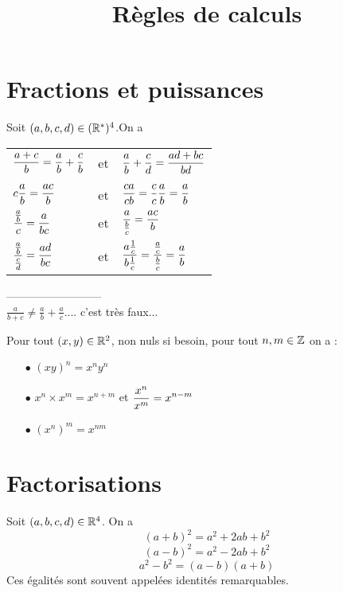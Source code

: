 \documentclass[a4paper, 11pt]{article}
\begin{document}
\title{Règles de calculs}

\section{Fractions et puissances}
\begin{prop}
	Soit $(a,b,c,d)\in (\mathbb{R}^*)^4$.On a
	\begin{center}
		\begin{tabular}{ l c l }
			$\displaystyle \frac{a+c}{b}=\frac{a}{b}+ \frac{c}{b}$          & et & $ \displaystyle \frac{a}{b}+\frac{c}{d}=\frac{ad+bc}{bd}$                                       \\  \\

			$\displaystyle c\frac{a}{b}=\frac{ac}{b} $                      & et & $\displaystyle \frac{ca}{cb}=\frac{c}{c}\frac{a}{b}  =\frac{a}{b}$ \vsec                        \\


			$\displaystyle \frac{\frac{a}{b}}{c} = \frac{a}{bc} $           & et & $\displaystyle \frac{a}{\frac{b}{c}} = \frac{ac}{b}$\vsec                                       \\

			$\displaystyle \frac{\frac{a}{b}}{\frac{c}{d}} = \frac{ad}{bc}$ & et & $\displaystyle \frac{a\frac{1}{c}}{b\frac{1}{c}} =\frac{\frac{a}{c}}{\frac{b}{c}} =\frac{a}{b}$
		\end{tabular}
	\end{center}
	--------------------------\\
	\footnotesize{ $\frac{a}{b+c }\neq \frac{a}{b}+\frac{a}{c}$.... c'est très faux...}
\end{prop}

\begin{prop} \label{prop-regle de calcul puissance}
	Pour tout $(x,y) \in \mathbb{R}^2$, non nuls si besoin, pour tout $n,m\in \mathbb{Z}$ on a :
	\begin{itemize}
		\item[$\bullet$] $(xy)^n =x^n y^n$
		\item[$\bullet$] $x^{n} \times x^m = x^{n+m}$ \; et \; $\displaystyle \frac{x^n}{x^m} =x^{n-m}$
		\item[$\bullet$] $ (x^n)^m = x^{nm}$
	\end{itemize}
\end{prop}



\section{Factorisations}
\begin{prop}
	Soit $(a,b,c,d)\in \mathbb{R}^4$. On a
	$$(a+b)^2=a^2+2ab+b^2$$
	$$(a-b)^2 = a^2 -2ab+b^2$$
	$$a^2-b^2 =(a-b)(a+b)$$
	Ces égalités sont souvent appelées identités remarquables.
\end{prop}
\end{document}
